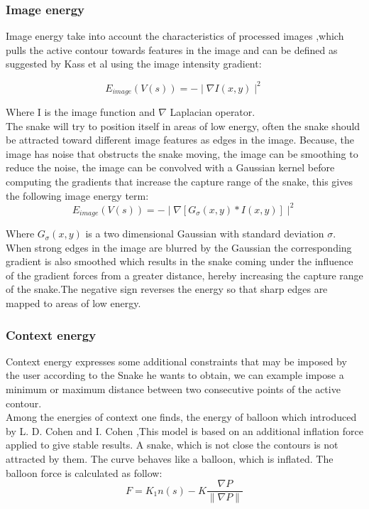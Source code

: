 \subsubsection{Image energy}
Image energy take into account the characteristics of processed images ,which
pulls the active contour towards features in the image and can be defined as
suggested by Kass et al \cite{2.1} using the image intensity gradient:

\begin{equation}
        E_{image} (V(s)) = -\mid \nabla I(x,y) \mid^2\label{eq:eq05}
\end{equation}

\hspace{-0.6cm}Where I is the image function and $\nabla$ Laplacian operator.\\
The snake will try to position itself in areas of low energy, often the snake
should be attracted toward different image features as edges in the image.
Because, the image has noise that obstructs the snake moving, the image can
be smoothing to reduce the noise, the image can be convolved with a Gaussian
kernel before computing the gradients that increase the capture range of the snake, this gives the following
image energy term:
\begin{equation}
        E_{image} (V(s)) = -\mid \nabla [G_{\sigma}(x,y) * I(x,y)] \mid^2\label{eq:eq06}
\end{equation}

\hspace{-0.6cm}Where $G_\sigma(x, y)$ is a two dimensional Gaussian with standard deviation $\sigma$. When
strong edges in the image are blurred by the Gaussian the corresponding
gradient is also smoothed which results in the snake coming under the
influence of the gradient forces from a greater distance, hereby increasing the
capture range of the snake.The negative sign reverses the energy so that sharp
edges are mapped to areas of low energy\cite{2.4}.

\subsubsection{Context energy}
Context energy expresses some additional constraints that may be imposed by
the user according to the Snake he wants to obtain, we can example impose a
minimum or maximum distance between two consecutive points of the active
contour.\\
Among the energies of context one finds, the energy of balloon which
introduced by L. D. Cohen and I. Cohen \cite{2.5},This model is based on an additional
inflation force applied to give stable results. A snake, which is not close the
contours is not attracted by them. The curve behaves like a balloon, which is
inflated. The balloon force is calculated as follow:
\begin{equation}
        F = K_1n(s) - K \frac{\nabla P}{\| \nabla P \|}\label{eq:eq07}
\end{equation}

